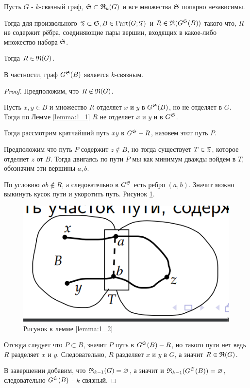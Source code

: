 \begin{customlm}{1.2} \label{lemma:1_2}
	Пусть $G$ - $k$-связный граф, $\S \subset \R_k(G)$ и все множества $\S$ попарно независимы.

	Тогда для произвольного $\T \subset \S, B \in \Part(G; \T)$ и $R \in \R(G^\S(B))$ такого что, $R$ не содержит рёбра, соединяющие пары вершин, входящих в какое-либо множество набора $\S$.
	
	Тогда $R \in \R(G)$.

	В частности, граф  $G^\S(B)$ является $k$-связным.
\end{customlm}

\begin{proof}

	Предположим, что $R \not \in \R(G)$.

	Пусть $x, y \in B$ и множество  $R$ отделяет $x$ и $y$ в $G^\S(B)$, но не отделяет в $G$.
	Тогда по Лемме \ref{lemma:1_1} $R$ не отделяет $x$ и $y$ и в $G^\S$.

	Тогда рассмотрим кратчайший путь  $xy$ в $G^\S - R$, назовем этот путь $P$.

	Предположим что путь $P$ содержит $z \not \in B$, но тогда существует $T \in \T$, которое отделяет $z$ от $B$.
	Тогда двигаясь по пути $P$ мы как минимум дважды войдем в $T$, обозначим эти вершины $a, b$.

	По условию $ab \not \in R$, а следовательно в $G^\S$ есть ребро $(a,b)$.
	Значит можно выкинуть кусок пути и укоротить путь.
	Рисунок \ref{fig:lemma_1_2}.

\begin{figure}[ht]
    \centering
	\includegraphics[width=0.3\columnwidth]{figures/lemma_1_2.png}
    \caption{Рисунок к лемме \ref{lemma:1_2}}
    \label{fig:lemma_1_2}
\end{figure}

	Отсюда следует что $P \subset B$, значит $P$ путь в  $G^\S(B) - R$, но такого пути нет ведь $R$ разделяет $x$ и $y$.
	Следовательно, $R$ разделяет  $x$ и  $y$ в $G$, а значит $R \in \R(G)$.

	В завершении добавим, что $\R_{k-1}(G) = \varnothing$, а значит и  $\R_{k - 1}(G^\S(B)) = \varnothing$, следовательно $G^\S(B)$ - $k$-связный.
	
\end{proof}

